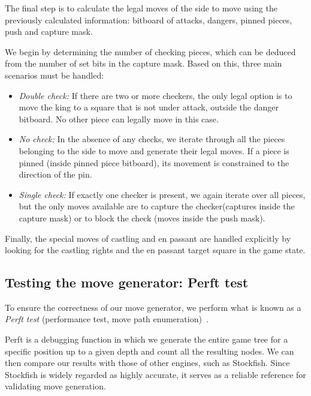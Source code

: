 \noindent \noindent The final step is to calculate the legal moves of the side to move using the previously calculated information: bitboard of attacks, dangers, pinned pieces, push and capture mask.

\vspace{1em}

\noindent
We begin by determining the number of checking pieces, which can be deduced from the number of set bits in the capture mask. Based on this, three main scenarios must be handled:


\begin{itemize}

    \item \textit{Double check:} If there are two or more checkers, the only legal option is to move the king to a square that is not under attack, outside the danger bitboard. No other piece can legally move in this case.

    \item \textit{No check:} In the absence of any checks, we iterate through all the pieces belonging to the side to move and generate their legal moves. If a piece is pinned (inside pinned piece bitboard), its movement is constrained to the direction of the pin.

    \item \textit{Single check:} If exactly one checker is present, we again iterate over all pieces, but the only moves available are to capture the checker(captures inside the capture mask) or to block the check (moves inside the push mask).

\end{itemize}

\noindent Finally, the special moves of castling and en passant are handled explicitly by looking for the castling rights and the en passant target square in the game state.

\subsection*{Testing the move generator: Perft test}

\noindent To ensure the correctness of our move generator, we perform what is known as a \textit{Perft test} (performance test, move path enumeration)~\cite{Perft}.

\vspace{1em}


\noindent Perft is a debugging function in which we generate the entire game tree for a specific position up to a given depth and count all the resulting nodes. We can then compare our results with those of other engines, such as Stockfish. Since Stockfish is widely regarded as highly accurate, it serves as a reliable reference for validating move generation.

